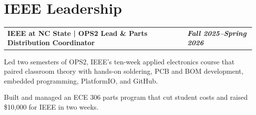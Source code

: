 \documentclass[10pt,letterpaper]{article}
\makeatletter
\newcommand{\resumeentry}[2]{%
  \begin{tabularx}{\textwidth}{@{}X>{\raggedleft\arraybackslash}p{2.40in}@{}}
    \textbf{#1} & \textbf{\textit{#2}}
  \end{tabularx}\vspace{-0.075cm}
}
\makeatother
\begin{document}
\section{IEEE Leadership}
\resumeentry{IEEE at NC State | OPS2 Lead \& Parts Distribution Coordinator}{Fall 2025--Spring 2026}
\begin{resumebullets}
  \item Led two semesters of OPS2, IEEE's ten-week applied electronics course that paired classroom theory with hands-on soldering, PCB and BOM development, embedded programming, PlatformIO, and GitHub.
  \item Built and managed an ECE 306 parts program that cut student costs and raised \$10,000 for IEEE in two weeks.
\end{resumebullets}
\end{document}
